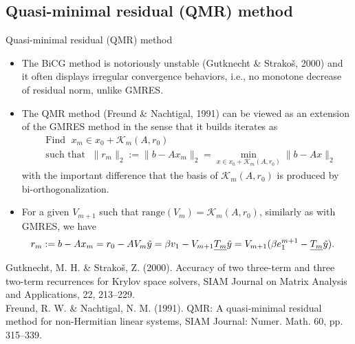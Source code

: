\documentclass[t,usepdftitle=false]{beamer}
\begin{document}
\subsection{Quasi-minimal residual (QMR) method}
\begin{frame}{Quasi-minimal residual (QMR) method}
\begin{itemize}
\item The BiCG method is notoriously unstable (Gutknecht \& Strako\v{s}, 2000) and it often displays irregular convergence behaviors, i.e., no monotone decrease of residual norm, unlike GMRES.
\item The QMR method (Freund \& Nachtigal, 1991) can be viewed as an extension of the GMRES method in the sense that it builds iterates as
\begin{align*}
&\text{Find }\;
x_m\in x_0+\mathcal{K}_m(A,r_0)\\
&\text{such that }\;
\|r_m\|_2:=\|b-Ax_m\|_2=\min_{x\in x_0+\mathcal{K}_m(A,r_0)}\|b-Ax\|_2
\end{align*}
with the important difference that the basis of $\mathcal{K}_m(A,r_0)$ is produced by bi-orthogonalization.
\item[] For a given $V_{m+1}$ such that $\text{range}(V_m)=\mathcal{K}_m(A,r_0)$, similarly as with GMRES, we have
\begin{align*}
\hspace{-.3cm}
r_m:=b-Ax_m=r_0-AV_m\tilde{y}=\beta v_1-V_{m+1}\underline{T_m}\tilde{y}=V_{m+1}(\beta e_1^{m+1}-\underline{T_m}\tilde{y}).
\end{align*}
\end{itemize}\smallskip
\tiny{Gutknecht, M. H. \& Strako\v{s}, Z. (2000). Accuracy of two three-term and three two-term recurrences for Krylov space solvers, SIAM Journal on Matrix Analysis and Applications, 22, 213–229.}\tinyskip\\
\tiny{Freund, R. W. \& Nachtigal, N. M. (1991). QMR: A quasi-minimal residual method for non-Hermitian linear systems, SIAM Journal: Numer. Math. 60, pp. 315–339.}
\end{frame}
\end{document}
